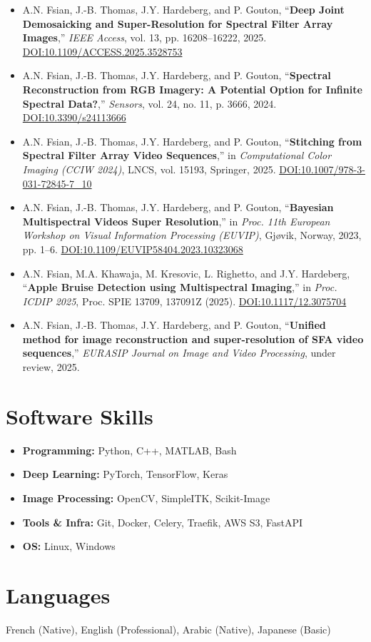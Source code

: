 \documentclass[a4paper,11pt]{article}
\begin{document}
\begin{itemize}
    \item A.N. Fsian, J.-B. Thomas, J.Y. Hardeberg, and P. Gouton, “\textbf{Deep Joint Demosaicking and Super-Resolution for Spectral Filter Array Images},” \textit{IEEE Access}, vol. 13, pp. 16208–16222, 2025. \href{https://doi.org/10.1109/ACCESS.2025.3528753}{DOI:10.1109/ACCESS.2025.3528753}
    
    \item A.N. Fsian, J.-B. Thomas, J.Y. Hardeberg, and P. Gouton, “\textbf{Spectral Reconstruction from RGB Imagery: A Potential Option for Infinite Spectral Data?},” \textit{Sensors}, vol. 24, no. 11, p. 3666, 2024. \href{https://doi.org/10.3390/s24113666}{DOI:10.3390/s24113666}
    
    \item A.N. Fsian, J.-B. Thomas, J.Y. Hardeberg, and P. Gouton, “\textbf{Stitching from Spectral Filter Array Video Sequences},” in \textit{Computational Color Imaging (CCIW 2024)}, LNCS, vol. 15193, Springer, 2025. \href{https://doi.org/10.1007/978-3-031-72845-7_10}{DOI:10.1007/978-3-031-72845-7\_10}
    
    \item A.N. Fsian, J.-B. Thomas, J.Y. Hardeberg, and P. Gouton, “\textbf{Bayesian Multispectral Videos Super Resolution},” in \textit{Proc. 11th European Workshop on Visual Information Processing (EUVIP)}, Gjøvik, Norway, 2023, pp. 1–6. \href{https://doi.org/10.1109/EUVIP58404.2023.10323068}{DOI:10.1109/EUVIP58404.2023.10323068}
    
    \item A.N. Fsian, M.A. Khawaja, M. Kresovic, L. Righetto, and J.Y. Hardeberg, “\textbf{Apple Bruise Detection using Multispectral Imaging},” in \textit{Proc. ICDIP 2025}, Proc. SPIE 13709, 137091Z (2025). \href{https://doi.org/10.1117/12.3075704}{DOI:10.1117/12.3075704}
    
    \item A.N. Fsian, J.-B. Thomas, J.Y. Hardeberg, and P. Gouton, “\textbf{Unified method for image reconstruction and super-resolution of SFA video sequences},” \textit{EURASIP Journal on Image and Video Processing}, under review, 2025.
\end{itemize}


\section{Software Skills}
\begin{itemize}
    \item \textbf{Programming:} Python, C++, MATLAB, Bash
    \item \textbf{Deep Learning:} PyTorch, TensorFlow, Keras
    \item \textbf{Image Processing:} OpenCV, SimpleITK, Scikit-Image
    \item \textbf{Tools \& Infra:} Git, Docker, Celery, Traefik, AWS S3, FastAPI
    \item \textbf{OS:} Linux, Windows
\end{itemize}

\section{Languages}
\noindent French (Native), English (Professional), Arabic (Native), Japanese (Basic)
\end{document}
